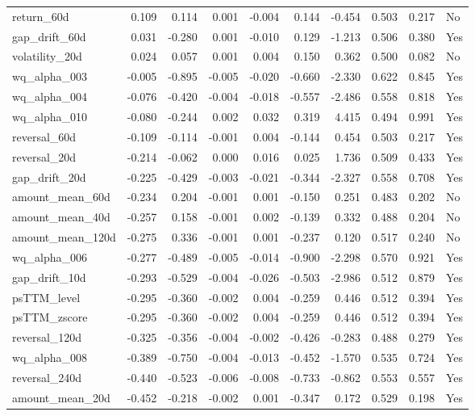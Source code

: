 \begin{longtable}{lrrrrrrrrl}
return\_60d & 0.109 & 0.114 & 0.001 & -0.004 & 0.144 & -0.454 & 0.503 & 0.217 & No \\
gap\_drift\_60d & 0.031 & -0.280 & 0.001 & -0.010 & 0.129 & -1.213 & 0.506 & 0.380 & Yes \\
volatility\_20d & 0.024 & 0.057 & 0.001 & 0.004 & 0.150 & 0.362 & 0.500 & 0.082 & No \\
wq\_alpha\_003 & -0.005 & -0.895 & -0.005 & -0.020 & -0.660 & -2.330 & 0.622 & 0.845 & Yes \\
wq\_alpha\_004 & -0.076 & -0.420 & -0.004 & -0.018 & -0.557 & -2.486 & 0.558 & 0.818 & Yes \\
wq\_alpha\_010 & -0.080 & -0.244 & 0.002 & 0.032 & 0.319 & 4.415 & 0.494 & 0.991 & Yes \\
reversal\_60d & -0.109 & -0.114 & -0.001 & 0.004 & -0.144 & 0.454 & 0.503 & 0.217 & Yes \\
reversal\_20d & -0.214 & -0.062 & 0.000 & 0.016 & 0.025 & 1.736 & 0.509 & 0.433 & Yes \\
gap\_drift\_20d & -0.225 & -0.429 & -0.003 & -0.021 & -0.344 & -2.327 & 0.558 & 0.708 & Yes \\
amount\_mean\_60d & -0.234 & 0.204 & -0.001 & 0.001 & -0.150 & 0.251 & 0.483 & 0.202 & No \\
amount\_mean\_40d & -0.257 & 0.158 & -0.001 & 0.002 & -0.139 & 0.332 & 0.488 & 0.204 & No \\
amount\_mean\_120d & -0.275 & 0.336 & -0.001 & 0.001 & -0.237 & 0.120 & 0.517 & 0.240 & No \\
wq\_alpha\_006 & -0.277 & -0.489 & -0.005 & -0.014 & -0.900 & -2.298 & 0.570 & 0.921 & Yes \\
gap\_drift\_10d & -0.293 & -0.529 & -0.004 & -0.026 & -0.503 & -2.986 & 0.512 & 0.879 & Yes \\
psTTM\_level & -0.295 & -0.360 & -0.002 & 0.004 & -0.259 & 0.446 & 0.512 & 0.394 & Yes \\
psTTM\_zscore & -0.295 & -0.360 & -0.002 & 0.004 & -0.259 & 0.446 & 0.512 & 0.394 & Yes \\
reversal\_120d & -0.325 & -0.356 & -0.004 & -0.002 & -0.426 & -0.283 & 0.488 & 0.279 & Yes \\
wq\_alpha\_008 & -0.389 & -0.750 & -0.004 & -0.013 & -0.452 & -1.570 & 0.535 & 0.724 & Yes \\
reversal\_240d & -0.440 & -0.523 & -0.006 & -0.008 & -0.733 & -0.862 & 0.553 & 0.557 & Yes \\
amount\_mean\_20d & -0.452 & -0.218 & -0.002 & 0.001 & -0.347 & 0.172 & 0.529 & 0.198 & Yes \\

\end{longtable}
